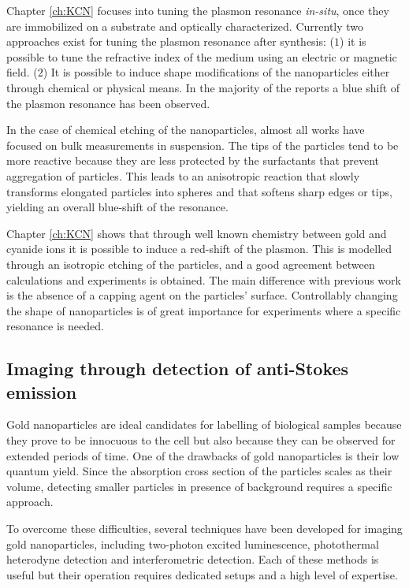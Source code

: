Chapter \ref{ch:KCN} focuses into tuning the plasmon resonance \textit{in-situ},
once they are immobilized on a substrate and optically characterized. Currently
two approaches exist for tuning the plasmon resonance after synthesis: ($1$) it
is possible to tune the refractive index of the medium using an electric or
magnetic field\cite{Kossyrev2005}. ($2$) It is possible to induce shape
modifications of the nanoparticles either through
chemical\cite{Jana2002,Rodriguez-Fernandez2005,Carbo-Argibay2007,Tsung2006,Ni2008}
or physical means\cite{Link2000,Horiguchi2008,Yorulmaz2012}. In the majority of
the reports a blue shift of the plasmon resonance has been observed.

In the case of chemical etching of the nanoparticles, almost all works have
focused on bulk measurements in suspension. The tips of the particles tend to be
more reactive because they are less protected by the surfactants that prevent
aggregation of particles. This leads to an anisotropic reaction that slowly
transforms elongated particles into spheres and that softens sharp edges or
tips, yielding an overall blue-shift of the resonance. 

Chapter \ref{ch:KCN} shows that through well known chemistry between gold and
cyanide ions it is possible to induce a red-shift of the plasmon. This is
modelled through an isotropic etching of the particles, and a good agreement
between calculations and experiments is obtained. The main difference with
previous work is the absence of a capping agent on the particles' surface.
Controllably changing the shape of nanoparticles is of great importance for
experiments where a specific resonance is needed.

\subsection{Imaging through detection of anti-Stokes emission}
Gold nanoparticles are ideal candidates for labelling of biological samples
because they prove to be innocuous to the cell\cite{Lewinski2008} but also
because they can be observed for extended periods of
time\cite{PEREZJUSTE2005,Mohamed2000}. One of the drawbacks of gold
nanoparticles is their low quantum yield. Since the absorption cross section of
the particles scales as their volume, detecting smaller particles in presence of
background requires a specific approach.

To overcome these difficulties, several techniques have been developed for
imaging gold nanoparticles, including two-photon excited
luminescence\cite{VandenBroek2013}, photothermal \mbox{heterodyne}
detection\cite{Berciaud2006} and interferometric detection\cite{Ignatovich2006}.
Each of these methods is useful but their operation requires dedicated setups
and a high level of expertise.


